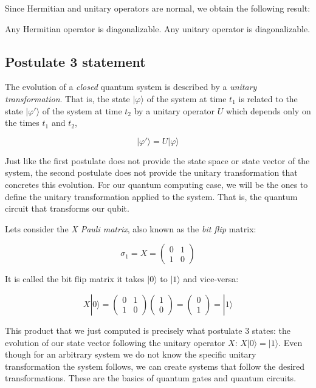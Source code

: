 Since Hermitian and unitary operators are normal, we obtain the following result:

\begin{corollary}
	Any Hermitian operator is diagonalizable. Any unitary operator is diagonalizable.
\end{corollary}


\subsection{Postulate 3 statement}

\begin{postulate}
	The evolution of a \emph{closed} quantum system is described by a \emph{unitary transformation}. That is, the state $|\varphi\rangle$ of the system at time $t_1$ is related to the state $|\varphi'\rangle$ of the system at time $t_2$ by a unitary operator $U$ which depends only on the times $t_1$ and $t_2$,
	
	$$ |\varphi'\rangle = U|\varphi\rangle $$
\end{postulate}

Just like the first postulate does not provide the state space or state vector of the system, the second postulate does not provide the unitary transformation that concretes this evolution. For our quantum computing case, we will be the ones to define the unitary transformation applied to the system. That is, the quantum circuit that transforms our qubit.

\begin{exampleth} Lets consider the \emph{X Pauli matrix}, also known as the \emph{bit flip} matrix:
	
	$$ \sigma_1 = X = 
	\begin{pmatrix}
		0 & 1 \\
		1 & 0 
	\end{pmatrix}
	$$
	
	It is called the bit flip matrix it takes $|0\rangle$ to $|1\rangle$ and vice-versa:
	
	$$  X|0\rangle = 
	\begin{pmatrix}
		0 & 1 \\
		1 & 0 
	\end{pmatrix}
	\begin{pmatrix}
		1 \\
		0 
	\end{pmatrix}=
	\begin{pmatrix}
		0 \\
		1 
	\end{pmatrix} =
	|1\rangle
	$$
	
	This product that we just computed is precisely what postulate 3 states: the evolution of our state vector following the unitary operator $X$: $X|0\rangle = |1\rangle$. Even though for an arbitrary system we do not know the specific unitary transformation the system follows, we can create systems that follow the desired transformations. These are the basics of quantum gates and quantum circuits. 
\end{exampleth}


